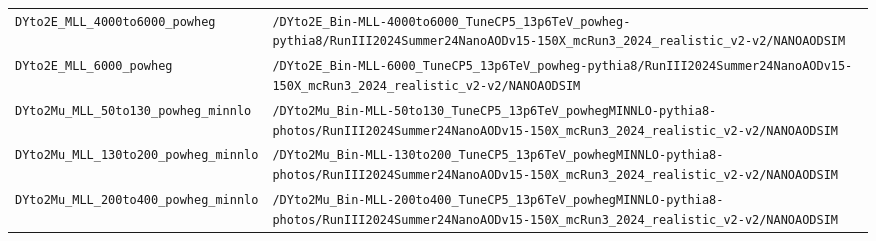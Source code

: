 \begin{longtable}{@{}>{\RaggedRight\arraybackslash}p{} >{\RaggedRight\arraybackslash}p{}@{}}
\addlinespace[2pt]
\texttt{DYto2E\_\allowbreak{}MLL\_\allowbreak{}4000to6000\_\allowbreak{}powheg} & \texttt{/\allowbreak{}DYto2E\_\allowbreak{}Bin-\allowbreak{}MLL-\allowbreak{}4000to6000\_\allowbreak{}TuneCP5\_\allowbreak{}13p6TeV\_\allowbreak{}powheg-\allowbreak{}pythia8/\allowbreak{}RunIII2024Summer24NanoAODv15-\allowbreak{}150X\_\allowbreak{}mcRun3\_\allowbreak{}2024\_\allowbreak{}realistic\_\allowbreak{}v2-\allowbreak{}v2/\allowbreak{}NANOAODSIM} \\
\addlinespace[2pt]
\texttt{DYto2E\_\allowbreak{}MLL\_\allowbreak{}6000\_\allowbreak{}powheg} & \texttt{/\allowbreak{}DYto2E\_\allowbreak{}Bin-\allowbreak{}MLL-\allowbreak{}6000\_\allowbreak{}TuneCP5\_\allowbreak{}13p6TeV\_\allowbreak{}powheg-\allowbreak{}pythia8/\allowbreak{}RunIII2024Summer24NanoAODv15-\allowbreak{}150X\_\allowbreak{}mcRun3\_\allowbreak{}2024\_\allowbreak{}realistic\_\allowbreak{}v2-\allowbreak{}v2/\allowbreak{}NANOAODSIM} \\
\addlinespace[2pt]
\texttt{DYto2Mu\_\allowbreak{}MLL\_\allowbreak{}50to130\_\allowbreak{}powheg\_\allowbreak{}minnlo} & \texttt{/\allowbreak{}DYto2Mu\_\allowbreak{}Bin-\allowbreak{}MLL-\allowbreak{}50to130\_\allowbreak{}TuneCP5\_\allowbreak{}13p6TeV\_\allowbreak{}powhegMINNLO-\allowbreak{}pythia8-\allowbreak{}photos/\allowbreak{}RunIII2024Summer24NanoAODv15-\allowbreak{}150X\_\allowbreak{}mcRun3\_\allowbreak{}2024\_\allowbreak{}realistic\_\allowbreak{}v2-\allowbreak{}v2/\allowbreak{}NANOAODSIM} \\
\addlinespace[2pt]
\texttt{DYto2Mu\_\allowbreak{}MLL\_\allowbreak{}130to200\_\allowbreak{}powheg\_\allowbreak{}minnlo} & \texttt{/\allowbreak{}DYto2Mu\_\allowbreak{}Bin-\allowbreak{}MLL-\allowbreak{}130to200\_\allowbreak{}TuneCP5\_\allowbreak{}13p6TeV\_\allowbreak{}powhegMINNLO-\allowbreak{}pythia8-\allowbreak{}photos/\allowbreak{}RunIII2024Summer24NanoAODv15-\allowbreak{}150X\_\allowbreak{}mcRun3\_\allowbreak{}2024\_\allowbreak{}realistic\_\allowbreak{}v2-\allowbreak{}v2/\allowbreak{}NANOAODSIM} \\
\addlinespace[2pt]
\texttt{DYto2Mu\_\allowbreak{}MLL\_\allowbreak{}200to400\_\allowbreak{}powheg\_\allowbreak{}minnlo} & \texttt{/\allowbreak{}DYto2Mu\_\allowbreak{}Bin-\allowbreak{}MLL-\allowbreak{}200to400\_\allowbreak{}TuneCP5\_\allowbreak{}13p6TeV\_\allowbreak{}powhegMINNLO-\allowbreak{}pythia8-\allowbreak{}photos/\allowbreak{}RunIII2024Summer24NanoAODv15-\allowbreak{}150X\_\allowbreak{}mcRun3\_\allowbreak{}2024\_\allowbreak{}realistic\_\allowbreak{}v2-\allowbreak{}v2/\allowbreak{}NANOAODSIM} \\

\end{longtable}
